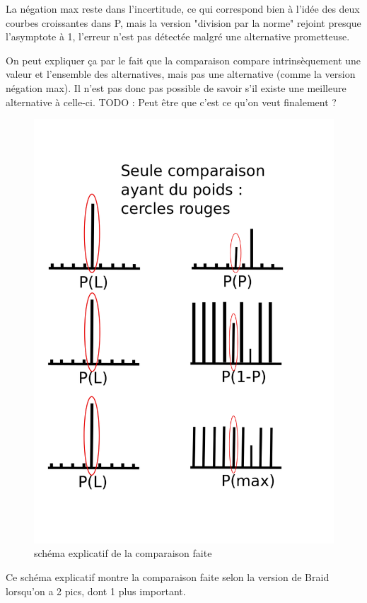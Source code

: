\documentclass{article}
\begin{document}
La négation max reste dans l'incertitude, ce qui correspond bien à l'idée des deux courbes croissantes dans P, mais la version "division par la norme" rejoint presque l'asymptote à 1, l'erreur n'est pas détectée malgré une alternative prometteuse.

On peut expliquer ça par le fait que la comparaison compare intrinsèquement une valeur et l'ensemble des alternatives, mais pas une alternative (comme la version négation max). Il n'est pas donc pas possible de savoir s'il existe une meilleure alternative à celle-ci.
TODO : Peut être que c'est ce qu'on veut finalement ?

\begin{figure}[H]
\centering
	\includegraphics[scale=0.3]{schemaPL.png}
	\caption{schéma explicatif de la comparaison faite}
\end{figure} 
 
    
Ce schéma explicatif montre la comparaison faite selon la version de Braid lorsqu'on a 2 pics, dont 1 plus important.
\end{document}
